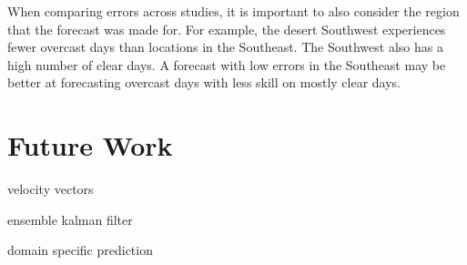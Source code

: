 When comparing errors across studies, it is important to also consider
the region that the forecast was made for.
For example, the desert Southwest experiences fewer overcast days than
locations in the Southeast.
The Southwest also has a high number of clear days.
A forecast with low errors in the Southeast may be better at
forecasting overcast days with less skill on mostly clear days.

\section{Future Work}
velocity vectors

ensemble kalman filter

domain specific prediction


